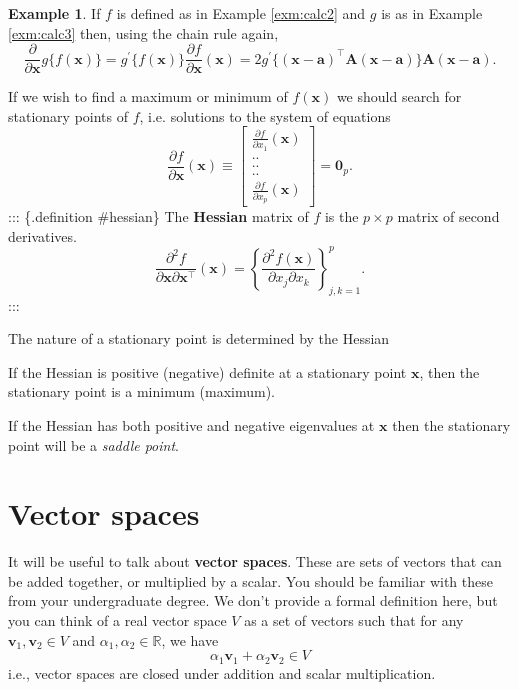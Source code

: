 \documentclass[
]{book}
\theoremstyle{definition}
\theoremstyle{definition}
\newtheorem{example}{Example}[chapter]
\theoremstyle{definition}
\theoremstyle{definition}
\theoremstyle{remark}
\begin{document}
\begin{example}
\protect\hypertarget{exm:calc4}{}\label{exm:calc4}If \(f\) is defined as in Example \ref{exm:calc2} and \(g\) is as in Example \ref{exm:calc3} then, using the chain rule again,
\[
\frac{\partial }{\partial \mathbf x} g\{f(\mathbf x)\}=g^{\prime} \{f(\mathbf x)\}\frac{\partial f}{\partial \mathbf x}(\mathbf x)
=2 g^{\prime}\{(\mathbf x- \mathbf a)^\top \mathbf A(\mathbf x- \mathbf a)\}\mathbf A(\mathbf x-\mathbf a).
\]
\end{example}

If we wish to find a maximum or minimum of \(f(\mathbf x)\) we should search for stationary points of \(f\), i.e.
solutions to the system of equations
\[
\frac{\partial f}{\partial \mathbf x}(\mathbf x)\equiv \left [ \begin{array}{c} \frac{\partial f}{\partial x_1}(\mathbf x)\\
 ..\\
 ..\\
 ..\\
 \frac{\partial f}{\partial x_p}(\mathbf x)
\end{array} \right ]={\mathbf 0}_p.
\]
::: \{.definition \#hessian\}
The \textbf{Hessian} matrix of \(f\) is the \(p \times p\) matrix of second derivatives.
\[
\frac{\partial^2f}{\partial \mathbf x\partial \mathbf x^\top}(\mathbf x) =\left \{ \frac{\partial^2 f(\mathbf x)}{\partial x_j \partial x_k}\right \}_{j,k=1}^p.
\]
:::

The nature of a stationary point is determined by the Hessian

If the Hessian is positive (negative) definite at a stationary point \(\mathbf x\), then the stationary point is a minimum (maximum).

If the Hessian has both positive and negative eigenvalues at \(\mathbf x\) then the stationary point will be a \emph{saddle point}.

\section{Vector spaces}\label{linalg-vecspaces}

It will be useful to talk about \textbf{vector spaces}. These are sets of vectors that can be added together, or multiplied by a scalar. You should be familiar with these from your undergraduate degree. We don't provide a formal definition here, but you can think of a real vector space \(V\) as a set of vectors such that for any \(\mathbf v_1, \mathbf v_2 \in V\) and \(\alpha_1, \alpha_2 \in \mathbb{R}\), we have
\[\alpha_1 \mathbf v_1 + \alpha_2 \mathbf v_2 \in V\]
i.e., vector spaces are closed under addition and scalar multiplication.
\end{document}

